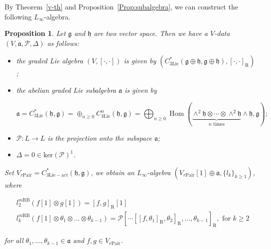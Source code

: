 \documentclass[12pt]{amsart}
\newtheorem{prop}[theorem]{Proposition}
\theoremstyle{definition}
\begin{document}
By Theorem~\ref{v-th} and Proposition~\ref{Prop:subalgebra}, we can construct the following $L_{\infty}$-algebra.
\begin{prop}\label{Prop: L
		infinty on relative modified RB Lie alge}
	Let $\mathfrak{g}$ and $\mathfrak{h}$ are two vector space. Then we have a $V$-data $(V, \mathfrak{a}, \mathcal{P}, \Delta)$ as follows:
	\begin{itemize}
		\item [(a)]the graded Lie algebra $(V,[\cdot, \cdot])$ is given by $\left(C^*_{\mathrm{3Lie}}(\mathfrak{g} \oplus \mathfrak{h}, \mathfrak{g} \oplus \mathfrak{h}),[\cdot, \cdot]_{\mathrm{R}}\right)$;
		\item [(b)] the abelian graded Lie subalgebra $\mathfrak{a}$ is given by
		
		$$
		\mathfrak{a}=C^*_{\mathrm{3Lie}}(\mathfrak{h}, \mathfrak{g})=\oplus_{n \geq 0} C^n_{\mathrm{3Lie}}(\mathfrak{h}, \mathfrak{g})=\bigoplus_{n \geq 0} \operatorname{Hom}\left(\underbrace{\wedge^2 \mathfrak{h} \otimes \cdots \otimes \wedge^2 \mathfrak{h}}_{n \text{ times}} \wedge \mathfrak{h}, \mathfrak{g}\right);
		$$
		\item [(c)] $\mathcal{P}: L \rightarrow L$ is the projection onto the subspace $\mathfrak{a}$;
		\item [(d)] $\Delta=0\in \mathrm{ker}(\mathcal{P})^1$.
		
		
	\end{itemize}
	Set $V_{r\mathrm{Pair}}=C^*_{\mathrm{3Lie-act}}(\mathfrak{h},\mathfrak{g})$,  we obtain  an $L_{\infty}$-algebra $(V_{r\mathrm{Pair}}[1] \oplus \mathfrak{a}, \{l_k\}_{k\geq 1} )$, where
	
	$$
	\begin{aligned}
		&	l^{m\mathrm{RB}}_2(f[1]\otimes g[1])	=[f,g]_{\mathrm{R}}[1]\\
		&l^{m\mathrm{RB}}_k\left(f[1]\otimes \theta_1\otimes \ldots\otimes \theta_{k-1}\right)=\mathcal{P}\left[\cdots\left[\left[f, \theta_1\right]_{\mathrm{R}}, \theta_2\right]_{\mathrm{R}}, \ldots, \theta_{k-1}\right]_{\mathrm{R}}, \text { for } k \geq 2
	\end{aligned}
	$$
	
	for all $\theta_1,\ldots,\theta_{k-1}\in \mathfrak{a}$ and $f,g\in V_{r\mathrm{Pair}}$.
	
	
	
\end{prop}

\end{document}
